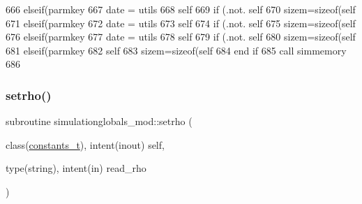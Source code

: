 \begin{DoxyCode}
666     \textcolor{keywordflow}{elseif}(parmkey%
667         date = utils%
668         self%
669         \textcolor{keywordflow}{if} (.not. self%
670         sizem=sizeof(self%
671     \textcolor{keywordflow}{elseif}(parmkey%
672         date = utils%
673         self%
674         \textcolor{keywordflow}{if} (.not. self%
675         sizem=sizeof(self%
676     \textcolor{keywordflow}{elseif}(parmkey%
677         date = utils%
678         self%
679         \textcolor{keywordflow}{if} (.not. self%
680         sizem=sizeof(self%
681     \textcolor{keywordflow}{elseif}(parmkey%
682         self%
683         sizem=sizeof(self%
684 \textcolor{keywordflow}{    end if}
685     \textcolor{keyword}{call }simmemory%
686 
\end{DoxyCode}
\mbox{\label{namespacesimulationglobals__mod_a7d41fc05216d326ae8c0b090362430d3}} 
\subsubsection{\texorpdfstring{setrho()}{setrho()}}
{\footnotesize\ttfamily subroutine simulationglobals\+\_\+mod\+::setrho (\begin{DoxyParamCaption}\item[{class(\mbox{\hyperlink{structsimulationglobals__mod_1_1constants__t}{constants\+\_\+t}}), intent(inout)}]{self,  }\item[{type(string), intent(in)}]{read\+\_\+rho }\end{DoxyParamCaption})\hspace{0.3cm}{\ttfamily [private]}}



